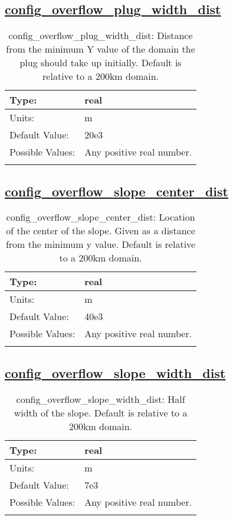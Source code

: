 \subsection[config\_overflow\_plug\_width\_dist]{\hyperref[sec:nm_tab_overflow]{config\_overflow\_plug\_width\_dist}}
\label{subsec:nm_sec_config_overflow_plug_width_dist}
\begin{center}
\begin{longtable}{| p{2.0in} || p{4.0in} |}
    \hline
    Type: & real \\
    \hline
    Units: & \si{m} \\
    \hline
    Default Value: & 20e3 \\
    \hline
    Possible Values: & Any positive real number. \\
    \hline
    \caption{config\_overflow\_plug\_width\_dist: Distance from the minimum Y value of the domain the plug should take up initially. Default is relative to a 200km domain.}
\end{longtable}
\end{center}
\subsection[config\_overflow\_slope\_center\_dist]{\hyperref[sec:nm_tab_overflow]{config\_overflow\_slope\_center\_dist}}
\label{subsec:nm_sec_config_overflow_slope_center_dist}
\begin{center}
\begin{longtable}{| p{2.0in} || p{4.0in} |}
    \hline
    Type: & real \\
    \hline
    Units: & \si{m} \\
    \hline
    Default Value: & 40e3 \\
    \hline
    Possible Values: & Any positive real number. \\
    \hline
    \caption{config\_overflow\_slope\_center\_dist: Location of the center of the slope. Given as a distance from the minimum y value. Default is relative to a 200km domain.}
\end{longtable}
\end{center}
\subsection[config\_overflow\_slope\_width\_dist]{\hyperref[sec:nm_tab_overflow]{config\_overflow\_slope\_width\_dist}}
\label{subsec:nm_sec_config_overflow_slope_width_dist}
\begin{center}
\begin{longtable}{| p{2.0in} || p{4.0in} |}
    \hline
    Type: & real \\
    \hline
    Units: & \si{m} \\
    \hline
    Default Value: & 7e3 \\
    \hline
    Possible Values: & Any positive real number. \\
    \hline
    \caption{config\_overflow\_slope\_width\_dist: Half width of the slope. Default is relative to a 200km domain.}
\end{longtable}
\end{center}
